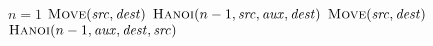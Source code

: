 \begin{codebox}
\li \If $n = 1$
\li \Then
    \Return $\proc{Move}(\id{src}, \id{dest})$
\li \Else
\li   $\proc{Hanoi}(n-1, \id{src}, \id{aux}, \id{dest})$
\li   $\proc{Move}(\id{src}, \id{dest})$
\li   $\proc{Hanoi}(n-1, \id{aux}, \id{dest}, \id{src})$
    \End
\end{codebox}
